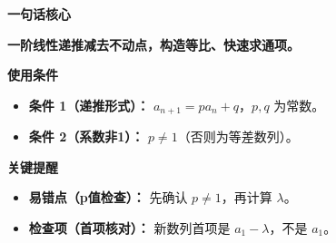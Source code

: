 \begin{summarybox}
	\textbf{\textcolor{CSummary}{一句话核心}}

	\textbf{一阶线性递推减去不动点，构造等比、快速求通项。}

	\medskip
	\textbf{\textcolor{CSummary}{使用条件}}
	\begin{itemize}[leftmargin=*, itemsep=0.5em, topsep=0.4em]
		\item \textbf{条件 1（递推形式）：} $a_{n+1}=p a_n+q$，$p,q$ 为常数。
		\item \textbf{条件 2（系数非1）：} $p\neq 1$（否则为等差数列）。
	\end{itemize}

	\medskip
	\textbf{\textcolor{CSummary}{关键提醒}}
	\begin{itemize}[leftmargin=*, itemsep=0.5em, topsep=0.4em]
		\item \textbf{易错点（p值检查）：} 先确认 $p\neq 1$，再计算 $\lambda$。
		\item \textbf{检查项（首项核对）：} 新数列首项是 $a_1-\lambda$，不是 $a_1$。
	\end{itemize}
\end{summarybox}
